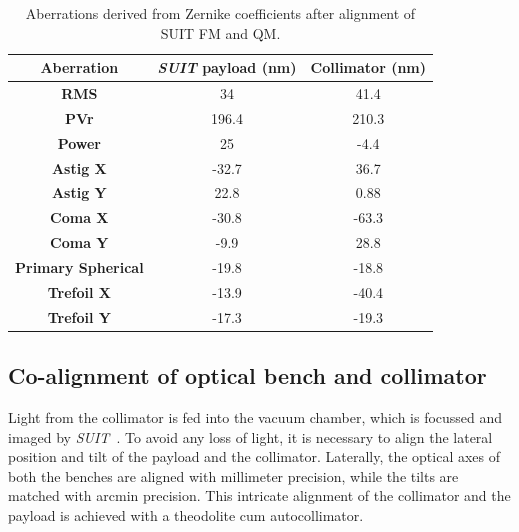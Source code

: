 \documentclass[12pt]{spieman}  %
\newcommand{\suit}{{\it SUIT~}}
\begin{document}
\begin{table}[ht]
\caption{Aberrations derived from Zernike coefficients after alignment of SUIT FM and QM.}
\label{table: zernikes}
    \begin{center}
			\begin{tabular}{|c|c|c|}
				\hline
				\rule[-1ex]{0pt}{2.5ex} \textbf{Aberration} & \textbf{\textit{SUIT} payload (nm)} & \textbf{Collimator (nm)}\\
				\hline
				\hline
				\rule[-1ex]{0pt}{2.5ex} \textbf{RMS} & 34 & 41.4 \\
				\hline
				\rule[-1ex]{0pt}{2.5ex} \textbf{PVr} & 196.4 & 210.3 \\
				\hline
				\rule[-1ex]{0pt}{2.5ex} \textbf{Power} & 25 & -4.4 \\
				\hline
				\rule[-1ex]{0pt}{2.5ex} \textbf{Astig X} & -32.7 & 36.7 \\
				\hline
				\rule[-1ex]{0pt}{2.5ex} \textbf{Astig Y} & 22.8 & 0.88 \\
				\hline
				\rule[-1ex]{0pt}{2.5ex} \textbf{Coma X} & -30.8 & -63.3 \\
				\hline
				\rule[-1ex]{0pt}{2.5ex} \textbf{Coma Y} & -9.9 & 28.8 \\
				\hline
				\rule[-1ex]{0pt}{2.5ex} \textbf{Primary Spherical} & -19.8 & -18.8 \\
				\hline
				\rule[-1ex]{0pt}{2.5ex} \textbf{Trefoil X} & -13.9 & -40.4 \\
				\hline
				\rule[-1ex]{0pt}{2.5ex} \textbf{Trefoil Y }& -17.3 & -19.3 \\
				\hline
			\end{tabular}
		\end{center}
	\end{table} 
	
\subsection{Co-alignment of optical bench and collimator}
Light from the collimator is fed into the vacuum chamber, which is focussed and imaged by \suit. To avoid any loss of light, it is necessary to align the lateral position and tilt of the payload and the collimator. Laterally, the optical axes of both the benches are aligned with millimeter precision, while the tilts are matched with arcmin precision. This intricate alignment of the collimator and the payload is achieved with a theodolite cum autocollimator.
\end{document}
